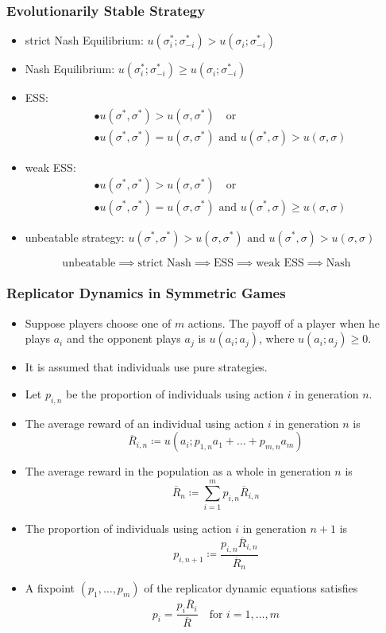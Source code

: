 \documentclass[UTF8,11pt,colorlinks,compress,openany]{beamer}%
\begin{document}
\begin{frame}\frametitle{Evolutionarily Stable Strategy}
\begin{itemize}
	\item strict Nash Equilibrium: $u(\sigma_i^*;\sigma_{-i}^*)>u(\sigma_i;\sigma_{-i}^*)$
	\item Nash Equilibrium: $u(\sigma_i^*;\sigma_{-i}^*)\geq u(\sigma_i;\sigma_{-i}^*)$
	\item ESS:
	\begin{align*}
	&\bullet u\left(\sigma^*,\sigma^*\right)>u\left(\sigma,\sigma^*\right)\quad\mbox{or}\\
	&\bullet u\left(\sigma^*,\sigma^*\right)=u\left(\sigma,\sigma^*\right)\mbox{ and } u\left(\sigma^*,\sigma\right)>u\left(\sigma,\sigma\right)
	\end{align*}
	\item weak ESS:
	\begin{align*}
	&\bullet u\left(\sigma^*,\sigma^*\right)>u\left(\sigma,\sigma^*\right)\quad\mbox{or}\\
	&\bullet u\left(\sigma^*,\sigma^*\right)=u\left(\sigma,\sigma^*\right)\mbox{ and } u\left(\sigma^*,\sigma\right)\geq u\left(\sigma,\sigma\right)
	\end{align*}
	\item unbeatable strategy:
	$u\left(\sigma^*,\sigma^*\right)>u\left(\sigma,\sigma^*\right)\mbox{ and } u\left(\sigma^*,\sigma\right)>u\left(\sigma,\sigma\right)$
\end{itemize}
\[\mbox{unbeatable}\implies\mbox{strict Nash}\implies\mbox{ESS}\implies\mbox{weak ESS}\implies\mbox{Nash}\]
\end{frame}

\begin{frame}\frametitle{Replicator Dynamics in Symmetric Games}
\setlength\abovedisplayskip{0pt}
\setlength\belowdisplayskip{0pt}
\begin{itemize}
	\item Suppose players choose one of $m$ actions. The payoff of a player when he plays $a_i$ and the opponent plays $a_j$ is $u(a_i;a_j)$, where $u(a_i;a_j)\geq 0$.
	\item It is assumed that individuals use pure strategies.
	\item Let $p_{i,n}$ be the proportion of individuals using action $i$ in generation $n$.
	\item The average reward of an individual using action $i$ in generation $n$ is
	\[\overline{R}_{i,n}\coloneqq u(a_i;p_{1,n}a_1+\dots+p_{m,n}a_m)\]
	\item The average reward in the population as a whole in generation $n$ is
	\[\overline{R}_n\coloneqq \sum_{i=1}^m p_{i,n}\overline{R}_{i,n}\]
	\item The proportion of individuals using action $i$ in generation $n+1$ is
	\[p_{i,n+1}\coloneqq \frac{p_{i,n}\overline{R}_{i,n}}{\overline{R}_n}\]
	\item A fixpoint $(p_1,\dots,p_m)$ of the replicator dynamic equations satisfies
	\[p_i=\frac{p_i\overline{R}_i}{\overline{R}}\quad \mbox{for } i=1,\dots,m\]
\end{itemize}
\end{frame}
\end{document}
